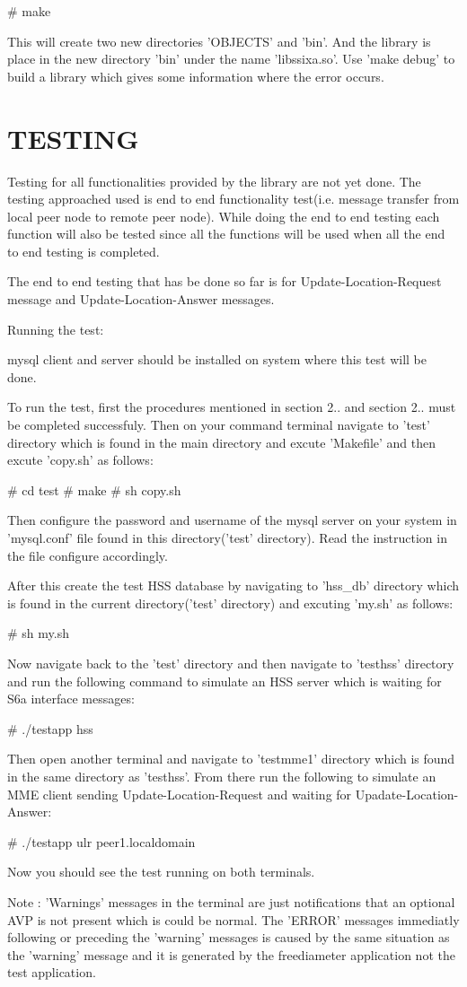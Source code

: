 \# make

\-This will create two new directories '\-O\-B\-J\-E\-C\-T\-S' and 'bin'. \-And the library is place in the new directory 'bin' under the name 'libssixa.\-so'. \-Use 'make debug' to build a library which gives some information where the error occurs.\hypertarget{index_testing}{}\section{\-T\-E\-S\-T\-I\-N\-G}\label{index_testing}
\-Testing for all functionalities provided by the library are not yet done. \-The testing approached used is end to end functionality test(i.\-e. message transfer from local peer node to remote peer node). \-While doing the end to end testing each function will also be tested since all the functions will be used when all the end to end testing is completed.

\-The end to end testing that has be done so far is for \-Update-\/\-Location-\/\-Request message and \-Update-\/\-Location-\/\-Answer messages.

\-Running the test\-:

mysql client and server should be installed on system where this test will be done.

\-To run the test, first the procedures mentioned in section 2.. and section 2.. must be completed successfuly. \-Then on your command terminal navigate to 'test' directory which is found in the main directory and excute '\-Makefile' and then excute 'copy.\-sh' as follows\-:

\# cd test \# make \# sh copy.\-sh

\-Then configure the password and username of the mysql server on your system in 'mysql.\-conf' file found in this directory('test' directory). \-Read the instruction in the file configure accordingly.

\-After this create the test \-H\-S\-S database by navigating to 'hss\-\_\-db' directory which is found in the current directory('test' directory) and excuting 'my.\-sh' as follows\-:

\# sh my.\-sh

\-Now navigate back to the 'test' directory and then navigate to 'testhss' directory and run the following command to simulate an \-H\-S\-S server which is waiting for \-S6a interface messages\-:

\# ./testapp hss

\-Then open another terminal and navigate to 'testmme1' directory which is found in the same directory as 'testhss'. \-From there run the following to simulate an \-M\-M\-E client sending \-Update-\/\-Location-\/\-Request and waiting for \-Upadate-\/\-Location-\/\-Answer\-:

\# ./testapp ulr peer1.\-localdomain

\-Now you should see the test running on both terminals.

\-Note \-: '\-Warnings' messages in the terminal are just notifications that an optional \-A\-V\-P is not present which is could be normal. \-The '\-E\-R\-R\-O\-R' messages immediatly following or preceding the 'warning' messages is caused by the same situation as the 'warning' message and it is generated by the freediameter application not the test application. 